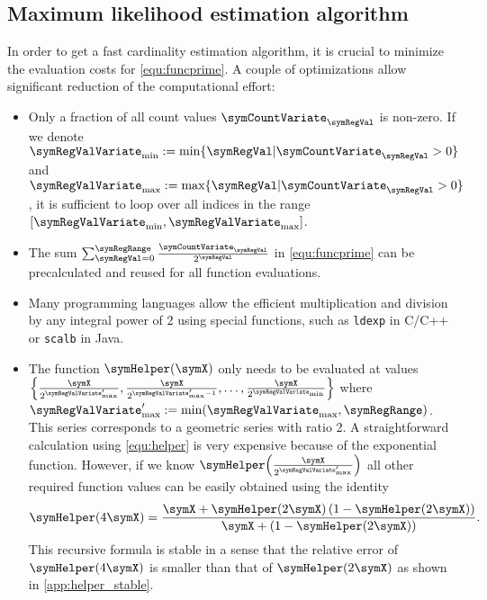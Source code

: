 \documentclass[a4paper]{scrartcl}
\begin{document}
\subsection{Maximum likelihood estimation algorithm}
In order to get a fast cardinality estimation algorithm, it is crucial to minimize the evaluation costs for \eqref{equ:funcprime}. A couple of optimizations allow significant reduction of the computational effort:
\begin{itemize}
\item Only a fraction of all count values $\symCountVariate_\symRegVal$ is non-zero. If we denote $\symRegValVariate_\text{min}:=\min\lbrace \symRegVal\vert\symCountVariate_\symRegVal>0\rbrace$ and $\symRegValVariate_\text{max}:=\max\lbrace \symRegVal\vert\symCountVariate_\symRegVal>0\rbrace$,  it is sufficient to loop over all indices in the range $[\symRegValVariate_\text{min}, \symRegValVariate_\text{max}]$.
\item The sum $\sum_{\symRegVal=0}^\symRegRange \frac{\symCountVariate_\symRegVal}{2^\symRegVal}$ in \eqref{equ:funcprime} can be precalculated and reused for all function evaluations.
\item Many programming languages allow the efficient multiplication and division by any integral power of 2 using special functions, such as \texttt{ldexp} in C/C++ or \texttt{scalb} in Java.
\item The function $\symHelper(\symX)$ only needs to be evaluated at values $\left\lbrace\frac{\symX}{2^{\symRegValVariate'_\text{max}}},\frac{\symX}{2^{\symRegValVariate'_\text{max}-1}},\ldots,\frac{\symX}{2^{\symRegValVariate_\text{min}}}\right\rbrace$ where $\symRegValVariate'_\text{max} := \min(\symRegValVariate_\text{max}, \symRegRange)$. This series corresponds to a geometric series with ratio 2. A straightforward calculation using \eqref{equ:helper} is very expensive because of the exponential function. However, if we know $\symHelper\!\left(\frac{\symX}{2^{\symRegValVariate'_\text{max}}}\right)$ all other required function values can be easily obtained using the identity
\begin{equation}
\label{equ:helper_recursion1}
\symHelper(4\symX) = \frac{\symX+\symHelper(2\symX)\left(1-\symHelper(2\symX)\right)}{\symX+\left(1-\symHelper(2\symX)\right)}.
\end{equation}
This recursive formula is stable in a sense that the relative error of $\symHelper(4\symX)$ is smaller than that of $\symHelper(2\symX)$ as shown in \cref{app:helper_stable}.


\end{itemize}
\end{document}

